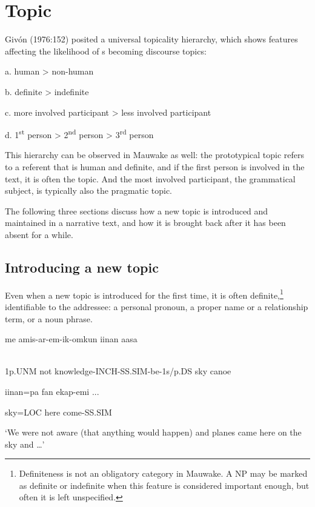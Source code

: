 \section{Topic} 
\hypertarget{RefHeading23801935131865}{}
Giv\'on (1976:152) posited a universal topicality hierarchy, which shows features affecting the likelihood of s becoming discourse topics: 

a.  human {{\textgreater}} non-human

b.  definite {{\textgreater}} indefinite

c.  more involved participant {{\textgreater}} less involved participant

d.  1\textsuperscript{st} person {{\textgreater}} 2\textsuperscript{nd} person {{\textgreater}} 3\textsuperscript{rd} person

This hierarchy can be observed in Mauwake as well: the prototypical topic refers to a referent that is human and definite, and if the first person is involved in the text, it is often the topic. And the most involved participant, the grammatical subject, is typically also the pragmatic topic. 

The following three sections discuss how a new topic is introduced and maintained in a narrative text, and how it is brought back after it has been absent for a while. 

\subsection{Introducing a new topic}
\hypertarget{RefHeading23821935131865}{}
Even when a new topic is introduced for the first time, it is often definite,\footnote{Definiteness is not an obligatory category in Mauwake. A NP may be marked as definite or indefinite when this  feature is considered important enough, but often it is left unspecified.} identifiable to the addressee: a personal pronoun, a proper name or a relationship term, or a noun phrase. 

\ea%
\label{ex:x1663}
\gll {}  me  amis-ar-em-ik-omkun  iinan  aasa  \\
      \\
\glt
\z

1p.UNM  not  knowledge-INCH-SS.SIM-be-1s/p.DS  sky  canoe

iinan=pa  fan  ekap-emi  ...

sky=LOC  here  come-SS.SIM

`We were not aware (that anything would happen) and planes came here on the sky and {\dots}'

